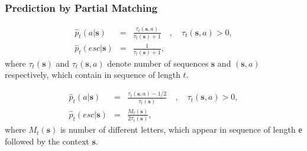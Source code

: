 \documentclass[14pt]{beamer}
\renewcommand{\vec}[1]{\ensuremath{\boldsymbol{#1}}}
\begin{document}
\begin{frame}
\frametitle{Prediction by Partial Matching}
\begin{itemize}    
\footnotesize {

    \item 
    \begin{eqnarray}
    \label{eq4_18}
    \hat {p}_t (a\vert {\vec s}) &=& \frac{\tau _t %
    (\vec s,a)}{\tau _t ({\vec s}) + 1} \quad , \quad \tau _t %
    (\vec s ,a) > 0, \\
    \label{eq4_19} \hat {p}_t (esc\vert {\vec s}) &=& \frac{1}{\tau _t
    ({\vec s}) + 1},
    \end{eqnarray}
    where $\tau _t ({\vec s})$ and $\tau _t ({\vec s},a)$ denote number of sequences ${\vec s}$ and $({\vec s},a)$ respectively,
    which contain in sequence of length $t$. 
    
    \item 
    \begin{eqnarray}
    \label{eq4_20} \hat {p}_t (a\vert {\vec s}) &=& \frac{\tau _t (\vec
     s,a) - 1 / 2}{\tau _t ({\vec s})} \quad , \quad \tau _t (\vec s,a) > 0,\\
    \label{eq4_21} \hat {p}_t (esc\vert {\vec s}) &=& \frac{M_t (\vec s
    )}{2\tau _t ({\vec s})},
    \end{eqnarray}
    where $M_t ({\vec s})$ is number of different letters, which appear in sequence of length $е$ followed by the context $\vec s$.

}
\end{itemize}
\end{frame}
\end{document}
